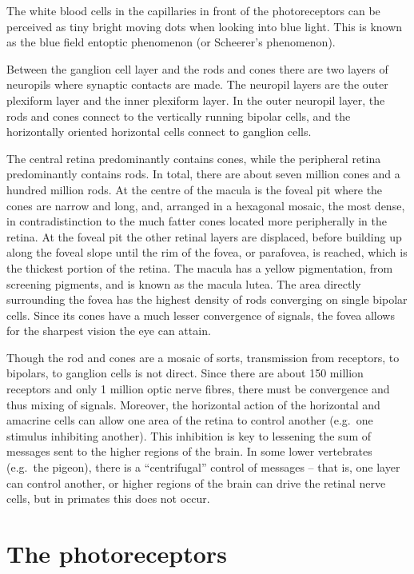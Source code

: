 The white blood cells in the capillaries in front of the photoreceptors can be perceived as tiny bright moving dots when looking into blue light. This is known as the blue field entoptic phenomenon (or Scheerer's phenomenon).

Between the ganglion cell layer and the rods and cones there are two layers of neuropils where synaptic contacts are made. The neuropil layers are the outer plexiform layer and the inner plexiform layer. In the outer neuropil layer, the rods and cones connect to the vertically running bipolar cells, and the horizontally oriented horizontal cells connect to ganglion cells.

The central retina predominantly contains cones, while the peripheral retina predominantly contains rods. In total, there are about seven million cones and a hundred million rods. At the centre of the macula is the foveal pit where the cones are narrow and long, and, arranged in a hexagonal mosaic, the most dense, in contradistinction to the much fatter cones located more peripherally in the retina. At the foveal pit the other retinal layers are displaced, before building up along the foveal slope until the rim of the fovea, or parafovea, is reached, which is the thickest portion of the retina. The macula has a yellow pigmentation, from screening pigments, and is known as the macula lutea. The area directly surrounding the fovea has the highest density of rods converging on single bipolar cells. Since its cones have a much lesser convergence of signals, the fovea allows for the sharpest vision the eye can attain.

Though the rod and cones are a mosaic of sorts, transmission from receptors, to bipolars, to ganglion cells is not direct. Since there are about 150 million receptors and only 1 million optic nerve fibres, there must be convergence and thus mixing of signals. Moreover, the horizontal action of the horizontal and amacrine cells can allow one area of the retina to control another (e.g.~one stimulus inhibiting another). This inhibition is key to lessening the sum of messages sent to the higher regions of the brain. In some lower vertebrates (e.g.~the pigeon), there is a ``centrifugal'' control of messages -- that is, one layer can control another, or higher regions of the brain can drive the retinal nerve cells, but in primates this does not occur.

\hypertarget{the-photoreceptors}{%
\section{The photoreceptors}\label{the-photoreceptors}}


